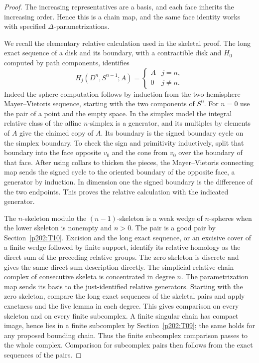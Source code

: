 \documentclass[11pt,oneside,openany]{book}
\theoremstyle{plain}
\theoremstyle{definition}
\theoremstyle{remark}
\begin{document}
\begin{proof}
The increasing representatives are a basis, and each face inherits
the increasing order. Hence this is a chain map, and the same face
identity works with specified \(\Delta\)-parametrizations.

We recall the elementary relative calculation used in the skeletal
proof. The long exact sequence of a disk and its boundary, with a
contractible disk and \(H_0\) computed by path components, identifies
\[
 H_j(D^n,S^{n-1};A)=
 \begin{cases} A & j=n,\\0&j\ne n.\end{cases}
\]
Indeed the sphere computation follows by induction from the
two-hemisphere Mayer--Vietoris sequence, starting with the two
components of \(S^0\). For \(n=0\) use the pair of a point and the
empty space. In the simplex model the integral relative class of
the affine \(n\)-simplex is a generator, and its multiples by
elements of \(A\) give the claimed copy of \(A\).
Its boundary is the signed boundary
cycle on the simplex boundary. To check the sign and primitivity
inductively, split that boundary into the face opposite \(v_0\) and
the cone from \(v_0\) over the boundary of that face. After using
collars to thicken the pieces, the Mayer--Vietoris connecting map
sends the signed cycle to the oriented boundary of the opposite
face, a generator by induction. In dimension one the signed
boundary is the difference of the two endpoints. This proves the
relative calculation with the indicated generator.

The \(n\)-skeleton modulo the \((n-1)\)-skeleton is a weak wedge of
\(n\)-spheres when the lower skeleton is nonempty and \(n>0\).
The pair is a good pair by Section~\ref{p202:T10}. Excision and the
long exact sequence, or an excisive cover of a finite wedge followed
by finite support, identify its relative homology as the direct sum
of the preceding relative groups. The zero skeleton is discrete
and gives the same direct-sum description directly. The
simplicial relative chain complex of consecutive skeleta is
concentrated in degree \(n\). The parametrization map sends its
basis to the just-identified relative generators. Starting with
the zero skeleton, compare the long exact sequences of the
skeletal pairs and apply exactness and the five lemma in each
degree. This gives comparison on every skeleton and on every
finite subcomplex. A finite singular chain has compact image,
hence lies in a finite subcomplex by Section~\ref{p202:T09};
the same holds for any proposed bounding chain. Thus the finite
subcomplex comparison passes to the whole complex. Comparison for
subcomplex pairs then follows from the exact sequences of the pairs.


\end{proof}
\end{document}
